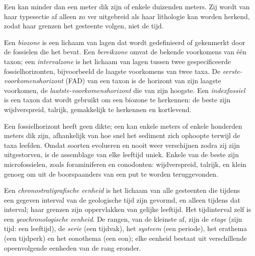 Een  kan minder dan een meter dik zijn of enkele duizenden meters. Zij wordt van haar typesectie af alleen zo ver uitgebreid als haar lithologie kan worden herkend, zodat haar grenzen het gesteente volgen, niet de tijd.

\begin{definition}\label{def:b1:stratigraphic-scale:biozone}
Een \emph{biozone} is een lichaam van lagen dat wordt gedefinieerd of gekenmerkt door de fossielen die het bevat. Een \emph{bereikzone} omvat de bekende voorkomens van één taxon; een \emph{intervalzone} is het lichaam van lagen tussen twee gespecificeerde fossielhorizonten, bijvoorbeeld de laagste voorkomens van twee taxa. De \emph{eerste-voorkomenshorizont} (FAD) van een taxon is de horizont van zijn laagste voorkomen, de \emph{laatste-voorkomenshorizont} die van zijn hoogste. Een \emph{indexfossiel} is een taxon dat wordt gebruikt om een biozone te herkennen: de beste zijn wijdverspreid, talrijk, gemakkelijk te herkennen en kortlevend.
\end{definition}

Een fossielhorizont heeft geen dikte; een  kan enkele meters of enkele honderden meters dik zijn, afhankelijk van hoe snel het sediment zich ophoopte terwijl de taxa leefden. Omdat soorten evolueren en nooit weer verschijnen zodra zij zijn uitgestorven, is de assemblage van elke leeftijd uniek. Enkele van de beste  zijn microfossielen, zoals foraminiferen en conodonten: wijdverspreid, talrijk, en klein genoeg om uit de boorspaanders van een put te worden teruggevonden.

\begin{definition}\label{def:b1:stratigraphic-scale:chronostratigraphy}
Een \emph{chronostratigrafische eenheid} is het lichaam van alle gesteenten die tijdens een gegeven interval van de geologische tijd zijn gevormd, en alleen tijdens dat interval; haar grenzen zijn oppervlakken van gelijke leeftijd. Het tijdinterval zelf is een \emph{geochronologische eenheid}. De rangen, van de kleinste af, zijn de \emph{etage} (zijn tijd: een leeftijd), de \emph{serie} (een tijdvak), het \emph{systeem} (een periode), het erathema (een tijdperk) en het eonothema (een eon); elke eenheid bestaat uit verschillende opeenvolgende eenheden van de rang eronder.
\end{definition}

